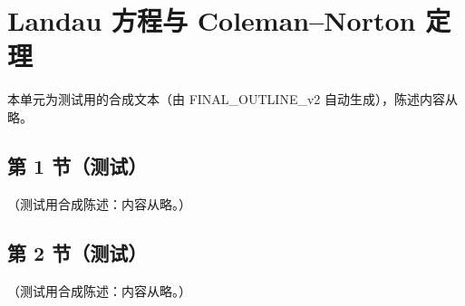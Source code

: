 \chapter{Landau 方程与 Coleman–Norton 定理}\label{app:appD}
本单元为测试用的合成文本（由 FINAL\_OUTLINE\_v2 自动生成），陈述内容从略。

\section{第 1 节（测试）}\label{sec:appD-gordan}

\begin{lemma}\label{lem:appD-gordan}
（测试用合成陈述：内容从略。）
\end{lemma}

\section{第 2 节（测试）}\label{sec:appD-momentum}

\begin{remark}\label{rem:appD-parameter-proof}
（测试用合成陈述：内容从略。）
\end{remark}
